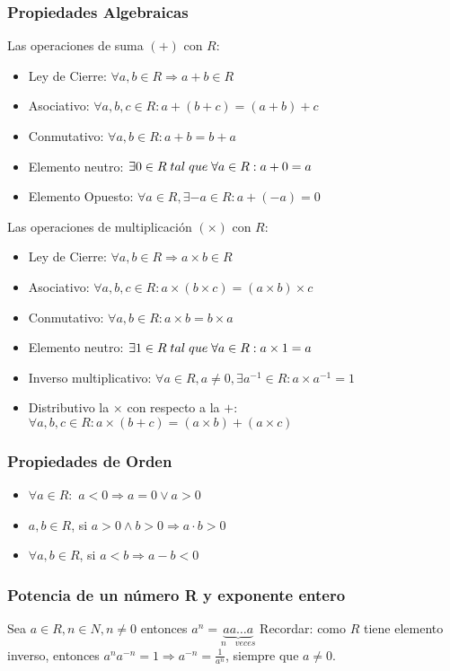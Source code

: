     \subsubsection{Propiedades Algebraicas}
      Las operaciones de suma $(+)$ con $R$: 
      \begin{itemize}
	 \item Ley de Cierre: $\forall a, b \in R \Rightarrow a+b \in R$ 
	 \item Asociativo: $\forall a,b,c \in R: a+(b+c)=(a+b)+c $
	 \item Conmutativo: $\forall a,b \in R: a+b=b+a$
	 \item Elemento neutro: $\exists 0 \in R \thickspace tal \thickspace que \thickspace \forall a \in R: a+0=a$
	 \item Elemento Opuesto: $\forall a \in R, \exists -a \in R: a+(-a)=0$
       \end{itemize}
      Las operaciones de multiplicaci\'on $(\times)$ con $R$:
      \begin{itemize}
	 \item Ley de Cierre: $\forall a, b \in R \Rightarrow a \times b \in R$
	 \item Asociativo: $\forall a,b,c \in R: a \times(b \times c)=(a \times b) \times c $
	 \item Conmutativo: $\forall a,b \in R: a \times b = b \times a $
	 \item Elemento neutro: $\exists 1 \in R \thickspace tal \thickspace que \thickspace \forall a \in R: a \times 1 = a$
	 \item Inverso multiplicativo: $\forall a \in R, a \neq 0, \exists a^{-1} \in R : a \times a^{-1} =  1$
	 \item Distributivo la $\times$ con respecto a la $+$: $\forall a,b,c \in R: a \times (b+c)= (a \times b) + (a \times c)$
      \end{itemize}
    \subsubsection{Propiedades de Orden}
    \begin{itemize}
     \item  $\forall a \in R: $ $a<0 \Rightarrow a=0 \vee a>0$ 
      \item $a,b \in R$, si $ a>0 \wedge b>0 \Rightarrow a \cdot b >0$
      \item $\forall a,b \in R$, si $a<b \Rightarrow a-b <0$
    \end{itemize}
    \subsubsection{Potencia de un número R y exponente entero}
    Sea $a \in R, n \in N, n \neq 0$ entonces $a^n=\underbrace{aa\ldots a}_{n \quad veces} $ \newline
    Recordar: como $R$ tiene elemento inverso, entonces $a^n a^{-n}=1 \Rightarrow a^{-n}=\frac{1}{a^n}$, siempre que $a \neq 0$.
